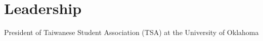 \documentclass[letterpaper]{deedy-resume-openfont}
\begin{document}

\section{Leadership}
President of Taiwanese Student Association (TSA) at the University of Oklahoma\\
\sectionsep
\end{document}
